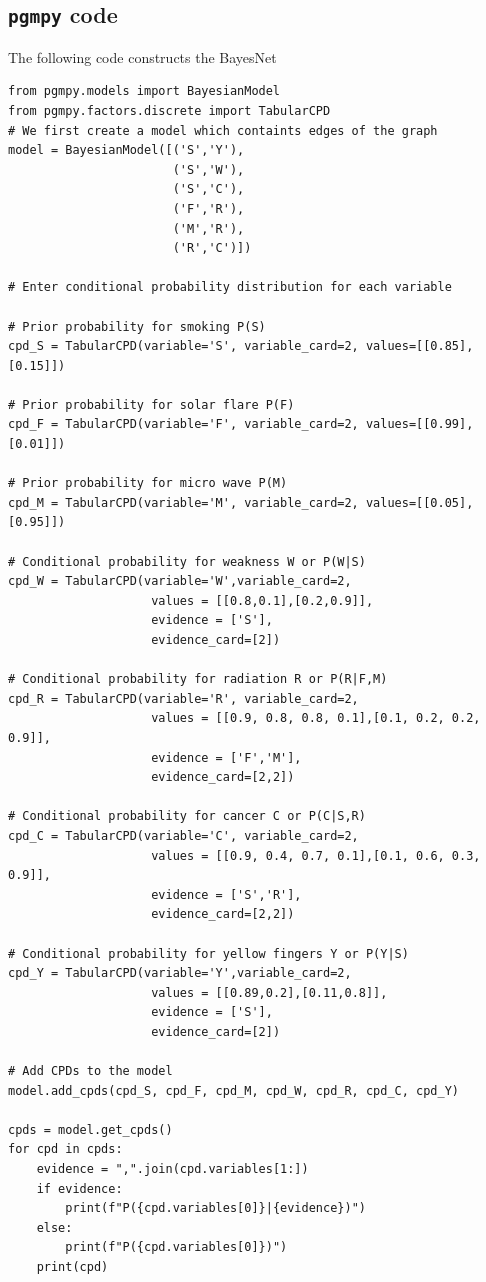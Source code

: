 \documentclass[12pt, letterpaper]{article}
\begin{document}
\subsection{\texttt{pgmpy} code}

The following code constructs the BayesNet

\begin{mdframed}[backgroundcolor=bg]
\begin{verbatim}
from pgmpy.models import BayesianModel
from pgmpy.factors.discrete import TabularCPD
# We first create a model which containts edges of the graph
model = BayesianModel([('S','Y'),
                       ('S','W'),
                       ('S','C'),
                       ('F','R'),
                       ('M','R'),
                       ('R','C')])

# Enter conditional probability distribution for each variable

# Prior probability for smoking P(S)
cpd_S = TabularCPD(variable='S', variable_card=2, values=[[0.85],[0.15]])

# Prior probability for solar flare P(F)
cpd_F = TabularCPD(variable='F', variable_card=2, values=[[0.99],[0.01]])

# Prior probability for micro wave P(M)
cpd_M = TabularCPD(variable='M', variable_card=2, values=[[0.05],[0.95]])

# Conditional probability for weakness W or P(W|S)
cpd_W = TabularCPD(variable='W',variable_card=2,
                    values = [[0.8,0.1],[0.2,0.9]],
                    evidence = ['S'],
                    evidence_card=[2])

# Conditional probability for radiation R or P(R|F,M)
cpd_R = TabularCPD(variable='R', variable_card=2,
                    values = [[0.9, 0.8, 0.8, 0.1],[0.1, 0.2, 0.2, 0.9]],
                    evidence = ['F','M'],
                    evidence_card=[2,2])

# Conditional probability for cancer C or P(C|S,R)
cpd_C = TabularCPD(variable='C', variable_card=2, 
                    values = [[0.9, 0.4, 0.7, 0.1],[0.1, 0.6, 0.3, 0.9]],                             
                    evidence = ['S','R'],
                    evidence_card=[2,2])

# Conditional probability for yellow fingers Y or P(Y|S)
cpd_Y = TabularCPD(variable='Y',variable_card=2,
                    values = [[0.89,0.2],[0.11,0.8]],
                    evidence = ['S'], 
                    evidence_card=[2])

# Add CPDs to the model
model.add_cpds(cpd_S, cpd_F, cpd_M, cpd_W, cpd_R, cpd_C, cpd_Y)

cpds = model.get_cpds()
for cpd in cpds:
    evidence = ",".join(cpd.variables[1:])
    if evidence:
        print(f"P({cpd.variables[0]}|{evidence})")
    else:
        print(f"P({cpd.variables[0]})")
    print(cpd)
\end{verbatim}
\end{mdframed}
\end{document}
